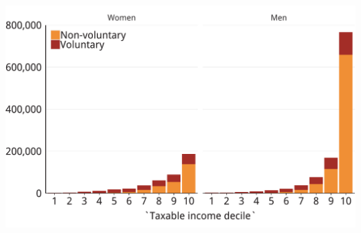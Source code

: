\documentclass[tikz]{standalone}\usepackage[]{graphicx}\usepackage[]{color}
\newenvironment{knitrout}{}{} %
\begin{document}
\begin{knitrout}
\color{fgcolor}
\includegraphics[width=11.000in,height=7.00in]{./Super-tax-targeting/b5-super-atlas/Figure4-6-1} 

\end{knitrout}
\end{document}
